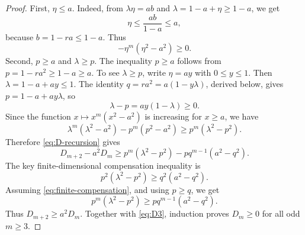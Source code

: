 \documentclass[11pt]{article}
\theoremstyle{definition}
\theoremstyle{remark}
\newcommand{\0}{\mathbf 0}
\begin{document}
\begin{proof}
First, $\eta\le a$.  Indeed, from $\lambda\eta=ab$ and $\lambda=1-a+\eta\ge1-a$, we get
\[
        \eta\le \frac{ab}{1-a}\le a,
\]
because $b=1-ra\le1-a$.  Thus
\[
        -\eta^m(\eta^2-a^2)\ge0.
\]
Second, $p\ge a$ and $\lambda\ge p$.  The inequality $p\ge a$ follows from $p=1-ra^2\ge1-a\ge a$.  To see $\lambda\ge p$, write $\eta=ay$ with $0\le y\le1$.  Then $\lambda=1-a+ay\le1$.  The identity $q=ra^2=a(1-y\lambda)$, derived below, gives $p=1-a+a y\lambda$, so
\[
        \lambda-p=ay(1-\lambda)\ge0.
\]
Since the function $x\mapsto x^m(x^2-a^2)$ is increasing for $x\ge a$, we have
\[
        \lambda^m(\lambda^2-a^2)-p^m(p^2-a^2)
        \ge
        p^m(\lambda^2-p^2).
\]
Therefore \eqref{eq:D-recursion} gives
\begin{equation}\label{eq:D-lower-pre-comp}
        D_{m+2}-a^2D_m
        \ge
        p^m(\lambda^2-p^2)-pq^{m-1}(a^2-q^2).
\end{equation}
The key finite-dimensional compensation inequality is
\begin{equation}\label{eq:finite-compensation}
        p^2(\lambda^2-p^2)\ge q^2(a^2-q^2).
\end{equation}
Assuming \eqref{eq:finite-compensation}, and using $p\ge q$, we get
\[
        p^m(\lambda^2-p^2)
        \ge
        p q^{m-1}(a^2-q^2).
\]
Thus $D_{m+2}\ge a^2D_m$.  Together with \eqref{eq:D3}, induction proves $D_m\ge0$ for all odd $m\ge3$.


\end{proof}
\end{document}
